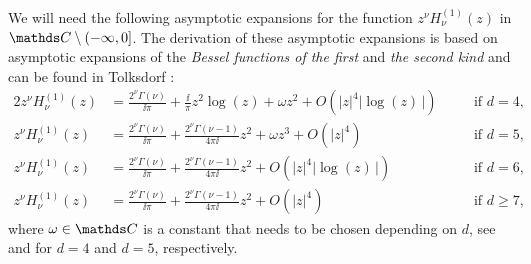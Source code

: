 We will need the following asymptotic expansions for the function $z^\nu H_\nu^{(1)}(z)$ in $\C \setminus (-\infty, 0]$.
The derivation of these asymptotic expansions is based on asymptotic expansions of the \emph{Bessel functions of the first} and \emph{the second kind} and can be found in Tolksdorf \cite[Sec.\@~4.2]{tolksdorf}:
\begin{alignat}{2}
  z^{\nu}H_\nu^{(1)}(z) &= \frac{2^\nu \Gamma(\nu)}{\ii \pi} + \frac{\ii}{\pi} z^2 \log(z) + \omega z^2 + O(|z|^4 \big|\log(z)\,\big|) \quad&&\text{if } d = 4, \label{eq:asymptoticd4}\\[0.5em]
  z^{\nu} H_{\nu}^{(1)}(z) &= \frac{2^\nu \Gamma(\nu)}{\ii\pi} + \frac{2^\nu \Gamma(\nu - 1)}{4 \pi \ii} z^2 + \omega z^3 + O(|z|^4) &&\text{if } d = 5, \label{eq:asymptoticd5}\\[0.5em]
  z^\nu H_\nu^{(1)}(z) &= \frac{2^\nu \Gamma(\nu)}{\ii \pi} + \frac{2^\nu \Gamma(\nu - 1)}{4\pi \ii}z^2 + O(|z|^4 \big|\log(z)\,\big|) &&\text{if } d = 6,\label{eq:asymptoticd6} \\[0.5em]
  z^\nu H_\nu^{(1)}(z) &= \frac{2^\nu \Gamma(\nu)}{\ii \pi} + \frac{2^\nu \Gamma(\nu - 1)}{4 \pi \ii} z^2 + O(|z|^4) &&\text{if } d \geq 7,\label{eq:asymptoticd7}
\end{alignat}
where $\omega \in \C$ is a constant that needs to be chosen depending on $d$, see \cite[Eq.\@~(4.19)]{tolksdorf} and \cite[Eq.\@~(4.20)]{tolksdorf} for $d = 4$ and $d = 5$, respectively.


